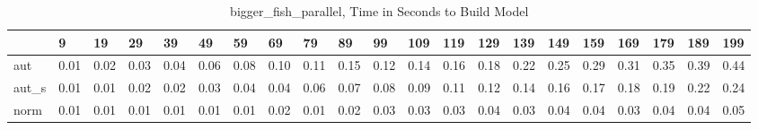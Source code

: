 \begin{table}
\caption{bigger_fish_parallel, Time in Seconds to Build Model}
\label{bigger_fish_parallel_model_time}
\begin{tabular}{lllllllllllllllllllll}
\toprule
 & 9 & 19 & 29 & 39 & 49 & 59 & 69 & 79 & 89 & 99 & 109 & 119 & 129 & 139 & 149 & 159 & 169 & 179 & 189 & 199 \\
\midrule
aut & 0.01 & 0.02 & 0.03 & 0.04 & 0.06 & 0.08 & 0.10 & 0.11 & 0.15 & 0.12 & 0.14 & 0.16 & 0.18 & 0.22 & 0.25 & 0.29 & 0.31 & 0.35 & 0.39 & 0.44 \\
aut_s & 0.01 & 0.01 & 0.02 & 0.02 & 0.03 & 0.04 & 0.04 & 0.06 & 0.07 & 0.08 & 0.09 & 0.11 & 0.12 & 0.14 & 0.16 & 0.17 & 0.18 & 0.19 & 0.22 & 0.24 \\
norm & 0.01 & 0.01 & 0.01 & 0.01 & 0.01 & 0.01 & 0.02 & 0.01 & 0.02 & 0.03 & 0.03 & 0.03 & 0.04 & 0.03 & 0.04 & 0.04 & 0.03 & 0.04 & 0.04 & 0.05 \\
\bottomrule
\end{tabular}
\end{table}
